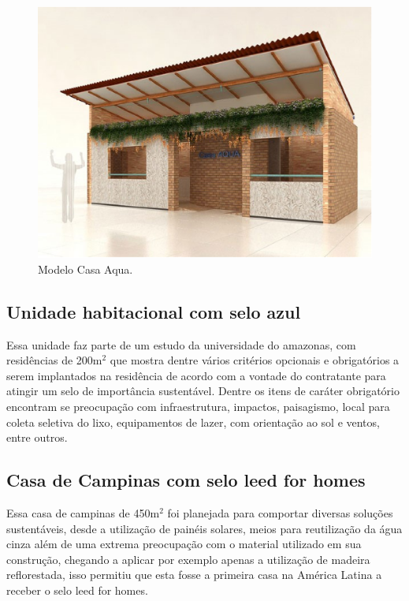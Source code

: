 \begin{figure}[H]
\begin{center}
\includegraphics[keepaspectratio,scale=0.6]{figuras/modelocasaaqua.jpg.eps}
\caption{Modelo Casa Aqua.}
\end{center}
\end{figure}

\subsection{Unidade habitacional com selo azul}

	Essa unidade faz parte de um estudo da universidade do amazonas, com residências de 200\si{\meter}$^2$ que mostra dentre vários critérios opcionais e obrigatórios a serem implantados na residência de acordo com a vontade do  contratante para atingir um selo de  importância sustentável. Dentre os itens de caráter obrigatório encontram se preocupação com infraestrutura, impactos, paisagismo, local para coleta seletiva do lixo, equipamentos de lazer, com orientação ao sol e ventos, entre outros.

\subsection{Casa de Campinas com selo leed for homes}

	Essa casa de campinas de 450\si{\meter}$^2$ foi planejada para comportar diversas soluções sustentáveis, desde a utilização de painéis solares, meios para reutilização da água cinza além de uma extrema preocupação com o material utilizado em sua construção, chegando a aplicar por exemplo apenas a  utilização de madeira reflorestada, isso  permitiu que esta fosse a primeira casa na América Latina a receber o selo leed for homes.

